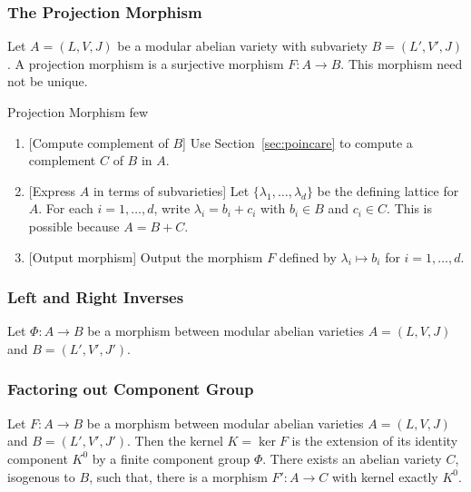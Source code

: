 \documentclass{article}
\begin{document}
\subsubsection{The Projection Morphism}

Let $A=(L, V, J)$ be a modular abelian variety with subvariety $B=(L', V', J)$.
A projection morphism is a surjective morphism $F:A\to B$. This morphism need
not be unique.
\begin{algorithm}{Projection Morphism}
    few
\begin{enumerate}
    \item{} [Compute complement of $B$]
        Use Section~\ref{sec:poincare} to compute a complement $C$ of $B$ in
        $A$. 
    \item{} [Express $A$ in terms of subvarieties]
        Let $\{\lambda_1,\ldots, \lambda_d\}$ be the defining lattice for $A$.
        For each $i=1,\ldots,d$, write $\lambda_i = b_i + c_i$ with $b_i\in B$
        and $c_i \in C$. This is possible because $A=B+C$.
    \item{} [Output morphism]
        Output the morphism $F$ defined by $\lambda_i\mapsto b_i$ for
        $i=1,\ldots,d$.
\end{enumerate}
\end{algorithm}

\subsubsection{Left and Right Inverses}

Let $\Phi:A\to B$ be a morphism between modular abelian varieties $A=(L, V, J)$
and $B=(L', V', J')$. 

\subsubsection{Factoring out Component Group}
\label{sec:factor_component}


Let $F:A\to B$ be a morphism between modular abelian varieties $A=(L, V, J)$
and $B=(L', V', J')$. Then the kernel $K=\ker F$ is the extension of its
identity component $K^0$ by a finite component group $\Phi$. There exists an
abelian variety $C$, isogenous to $B$, such that, there is a morphism $F':A\to
C$ with kernel exactly $K^0$.
\end{document}
